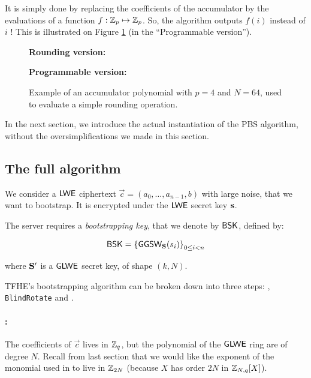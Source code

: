 It is simply done by replacing the coefficients of the accumulator by the evaluations of a function $f:\mathbb{Z}_p \mapsto \mathbb{Z}_p$. So, the algorithm outputs $f(i)$ instead of $i$ ! This is illustrated on Figure \ref{fig:illustration_accumulator} (in the ``Programmable version'').


\begin{figure}
	\centering
	
	
	\vspace{1.5em}
	
	\textbf{Rounding version:}\\[0.5em]
	
	\vspace{1.5em}
	
	\textbf{Programmable version:}\\[0.5em]
	
	\caption{Example of an accumulator polynomial with $p=4$ and $N=64$, used to evaluate a simple rounding operation.}
	\label{fig:illustration_accumulator}
\end{figure}

\bigskip

In the next section, we introduce the actual instantiation of the PBS algorithm, without the oversimplifications we made in this section.

\subsection{The full algorithm}
\label{sec:pbs_algorithm}

We consider a $\textsf{LWE}$ ciphertext $\vec c = (a_0, \dots, a_{n-1}, b)$ with large noise, that we want to bootstrap. It is encrypted under the $\textsf{LWE}$ secret key $\mathbf s$. 

The server requires a \textit{bootstrapping key}, that we denote by $\textsf{BSK}$, defined by:

\[
	\textsf{BSK} = \left \lbrace \textsf{GGSW}_{\mathbf S}(s_i) \right \rbrace_{0 \le i < n}
\]

where $\mathbf S'$ is a $\textsf{GLWE}$ secret key, of shape $(k, N)$.

\bigskip
TFHE's bootstrapping algorithm can be broken down into three steps: \ModSwitch, \texttt{BlindRota\-te} and \SampleExtract.

\paragraph{\ModSwitch:} The coefficients of $\vec c$ lives in $\mathbb{Z}_q$, but the polynomial of the $\textsf{GLWE}$ ring are of degree $N$. Recall from last section that we would like the exponent of the monomial used in \BlindRotate to live in $\mathbb{Z}_{2N}$ (because $X$ has order $2N$ in $\mathbb{Z}_{N,q}[X]$).

